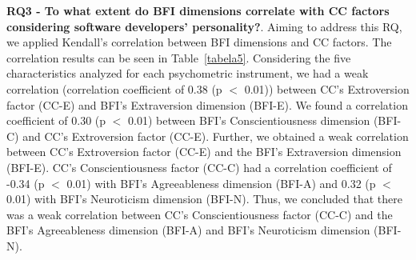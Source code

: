 \textbf{RQ3 - To what extent do BFI dimensions correlate with CC factors considering software developers’ personality?}. Aiming to address this RQ, we applied Kendall’s correlation between BFI dimensions and CC factors. The correlation results can be seen in Table~\ref{tabela5}. Considering the five characteristics analyzed for each psychometric instrument, we had a weak correlation (correlation coefficient of 0.38 (p $<$ 0.01)) between CC's Extroversion factor (CC-E) and BFI's Extraversion dimension (BFI-E). We found a correlation coefficient of 0.30 (p $<$ 0.01) between BFI's Conscientiousness dimension (BFI-C) and CC's Extroversion factor (CC-E). Further, we obtained a weak correlation between CC's Extroversion factor (CC-E) and the BFI's Extraversion dimension (BFI-E). 
CC's Conscientiousness factor (CC-C) had a correlation coefficient of -0.34 (p $<$ 0.01) with BFI's Agreeableness dimension (BFI-A) and 0.32 (p $<$ 0.01) with BFI's Neuroticism dimension (BFI-N). Thus, we concluded that there was a weak correlation between CC's Conscientiousness factor (CC-C) and the BFI's Agreeableness dimension (BFI-A) and BFI's Neuroticism dimension (BFI-N).  


\begin{table}[!ht]
\centering
\caption{Correlation between BFI Dimensions and context cards factors.}
\label{tabela5}
\end{table}


